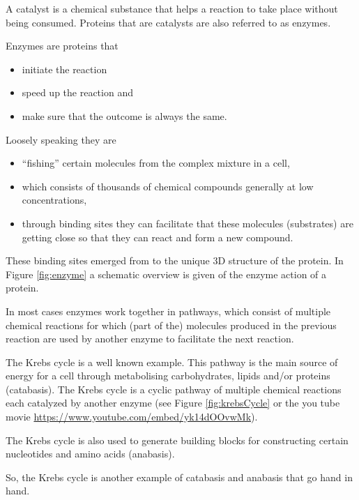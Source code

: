 \documentclass[
  11pt,
]{book}
\providecommand{\tightlist}{%
  \setlength{\itemsep}{0pt}\setlength{\parskip}{0pt}}
\begin{document}
A catalyst is a chemical substance that helps a reaction to take place without being consumed. Proteins that are catalysts are also referred to as enzymes.

Enzymes are proteins that

\begin{itemize}
\tightlist
\item
  initiate the reaction
\item
  speed up the reaction and
\item
  make sure that the outcome is always the same.
\end{itemize}

Loosely speaking they are

\begin{itemize}
\tightlist
\item
  ``fishing'' certain molecules from the complex mixture in a cell,
\item
  which consists of thousands of chemical compounds generally at low concentrations,
\item
  through binding sites they can facilitate that these molecules (substrates) are getting close so that they can react and form a new compound.
\end{itemize}

These binding sites emerged from to the unique 3D structure of the protein. In Figure \ref{fig:enzyme} a schematic overview is given of the enzyme action of a protein.

In most cases enzymes work together in pathways, which consist of multiple chemical reactions for which (part of the) molecules produced in the previous reaction are used by another enzyme to facilitate the next reaction.

The Krebs cycle is a well known example. This pathway is the main source of energy for a cell through metabolising carbohydrates, lipids and/or proteins (catabasis). The Krebs cycle is a cyclic pathway of multiple chemical reactions each catalyzed by another enzyme (see Figure \ref{fig:krebsCycle} or the you tube movie \url{https://www.youtube.com/embed/yk14dOOvwMk}).

The Krebs cycle is also used to generate building blocks for constructing certain nucleotides and amino acids (anabasis).

So, the Krebs cycle is another example of catabasis and anabasis that go hand in hand.
\end{document}
